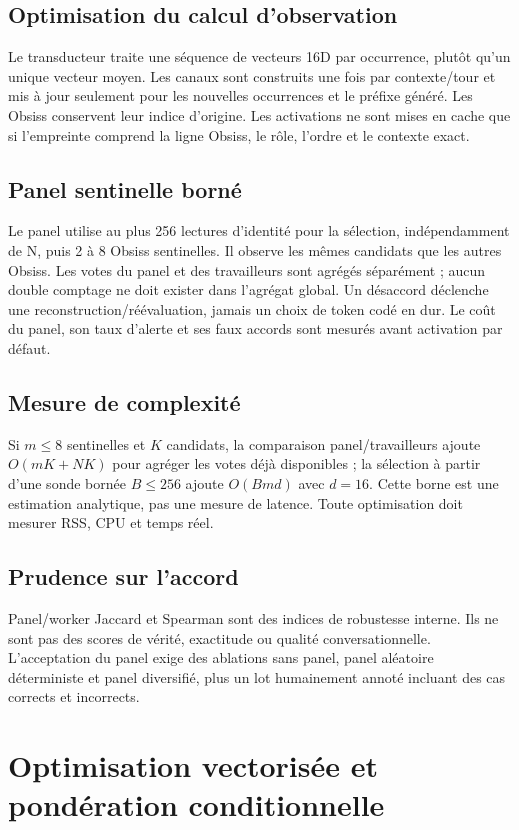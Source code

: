 \documentclass[11pt,a4paper]{report}
\begin{document}
\section{Optimisation du calcul d'observation}
Le transducteur traite une séquence de vecteurs 16D par occurrence, plutôt qu'un unique vecteur moyen. Les canaux sont construits une fois par contexte/tour et mis à jour seulement pour les nouvelles occurrences et le préfixe généré. Les Obsiss conservent leur indice d'origine. Les activations ne sont mises en cache que si l'empreinte comprend la ligne Obsiss, le rôle, l'ordre et le contexte exact.

\section{Panel sentinelle borné}
Le panel utilise au plus 256 lectures d'identité pour la sélection, indépendamment de N, puis 2 à 8 Obsiss sentinelles. Il observe les mêmes candidats que les autres Obsiss. Les votes du panel et des travailleurs sont agrégés séparément ; aucun double comptage ne doit exister dans l'agrégat global. Un désaccord déclenche une reconstruction/réévaluation, jamais un choix de token codé en dur. Le coût du panel, son taux d'alerte et ses faux accords sont mesurés avant activation par défaut.

\section{Mesure de complexité}
Si $m\leq8$ sentinelles et $K$ candidats, la comparaison panel/travailleurs ajoute $O(mK+NK)$ pour agréger les votes déjà disponibles ; la sélection à partir d'une sonde bornée $B\leq256$ ajoute $O(Bmd)$ avec $d=16$. Cette borne est une estimation analytique, pas une mesure de latence. Toute optimisation doit mesurer RSS, CPU et temps réel.

\section{Prudence sur l'accord}
Panel/worker Jaccard et Spearman sont des indices de robustesse interne. Ils ne sont pas des scores de vérité, exactitude ou qualité conversationnelle. L'acceptation du panel exige des ablations sans panel, panel aléatoire déterministe et panel diversifié, plus un lot humainement annoté incluant des cas corrects et incorrects.



\chapter{Optimisation vectorisée et pondération conditionnelle}
\end{document}
